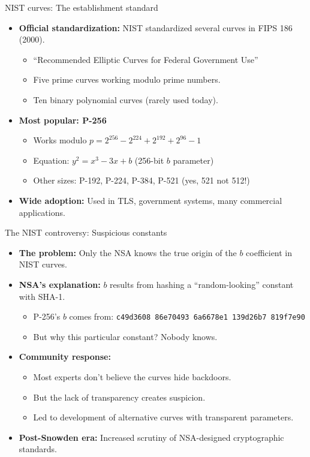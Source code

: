 \documentclass[aspectratio=169, lualatex, handout]{beamer}
\begin{document}
\begin{frame}{NIST curves: The establishment standard}
	\begin{itemize}
		\item \textbf{Official standardization:} NIST standardized several curves in FIPS 186 (2000).
		      \begin{itemize}
			      \item ``Recommended Elliptic Curves for Federal Government Use''
			      \item Five prime curves working modulo prime numbers.
			      \item Ten binary polynomial curves (rarely used today).
		      \end{itemize}
		\item \textbf{Most popular: P-256}
		      \begin{itemize}
			      \item Works modulo $p = 2^{256} - 2^{224} + 2^{192} + 2^{96} - 1$
			      \item Equation: $y^2 = x^3 - 3x + b$ (256-bit $b$ parameter)
			      \item Other sizes: P-192, P-224, P-384, P-521 (yes, 521 not 512!)
		      \end{itemize}
		\item \textbf{Wide adoption:} Used in TLS, government systems, many commercial applications.
	\end{itemize}
\end{frame}

\begin{frame}{The NIST controversy: Suspicious constants}
	\begin{itemize}
		\item \textbf{The problem:} Only the NSA knows the true origin of the $b$ coefficient in NIST curves.
		\item \textbf{NSA's explanation:} $b$ results from hashing a ``random-looking'' constant with SHA-1.
		      \begin{itemize}
			      \item P-256's $b$ comes from: \texttt{c49d3608 86e70493 6a6678e1 139d26b7 819f7e90}
			      \item But why this particular constant? Nobody knows.
		      \end{itemize}
		\item \textbf{Community response:}
		      \begin{itemize}
			      \item Most experts don't believe the curves hide backdoors.
			      \item But the lack of transparency creates suspicion.
			      \item Led to development of alternative curves with transparent parameters.
		      \end{itemize}
		\item \textbf{Post-Snowden era:} Increased scrutiny of NSA-designed cryptographic standards.
	\end{itemize}
\end{frame}
\end{document}
